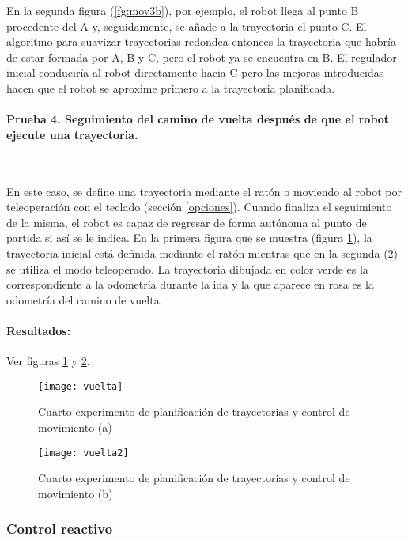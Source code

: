 En la segunda figura (\ref{fg:mov3b}), por ejemplo, el robot llega al punto B procedente del A y, seguidamente, se añade a la trayectoria el punto C. El algoritmo para suavizar trayectorias redondea entonces la trayectoria que habría de estar formada por A, B y C, pero el robot ya se encuentra en B. El regulador inicial conduciría al robot directamente hacia C pero las mejoras introducidas hacen que el robot se aproxime primero a la trayectoria planificada.

\clearpage
\paragraph{Prueba 4. Seguimiento del camino de vuelta después de que el robot ejecute una trayectoria.}\ %

\noindent
En este caso, se define una trayectoria mediante el ratón o moviendo al robot por teleoperación con el teclado (sección \ref{opciones}). Cuando finaliza el seguimiento de la misma, el robot es capaz de regresar de forma autónoma al punto de partida si así se le indica. En la primera figura que se muestra (figura \ref{fg:mov4a}), la trayectoria inicial está definida mediante el ratón mientras que en la segunda (\ref{fg:mov4b}) se utiliza el modo teleoperado. La trayectoria dibujada en color verde es la correspondiente a la odometría durante la ida y la que aparece en rosa es la odometría del camino de vuelta.

\paragraph{Resultados:} Ver figuras \ref{fg:mov4a} y \ref{fg:mov4b}.

\begin{figure}[h]
  \centering\texttt{[image: vuelta]}\\
 \caption{Cuarto experimento de planificación de trayectorias y control de movimiento (a)}\label{fg:mov4a}
\end{figure}

\begin{figure}[h]
\centering\texttt{[image: vuelta2]}
  \caption{Cuarto experimento de planificación de trayectorias y control de movimiento (b)}\label{fg:mov4b}
\end{figure}

\clearpage

\subsubsection{Control reactivo}

